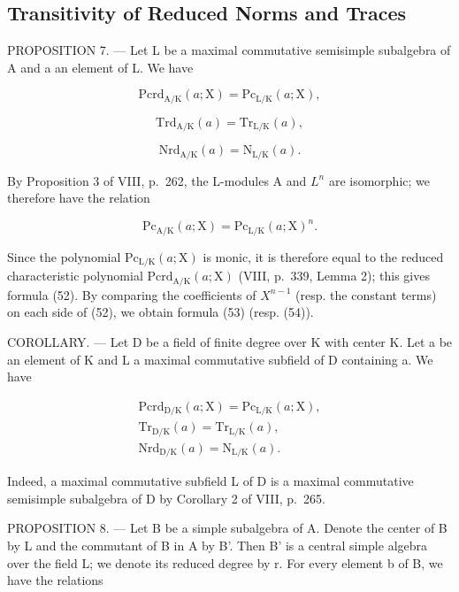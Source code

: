 \subsection{Transitivity of Reduced Norms and Traces}

PROPOSITION 7. --- Let L be a maximal commutative semisimple subalgebra of A and a an element of L. We have

\[
\mathrm{Pcrd} _ {\mathrm{A/K}} (a; \mathrm{X}) = \mathrm{Pc} _ {\mathrm{L/K}} (a; \mathrm{X}),\tag{52}
\]

\[
\mathrm{Trd} _ {\mathrm{A/K}} (a) = \mathrm{Tr} _ {\mathrm{L/K}} (a),\tag{53}
\]

\[
\mathrm{Nrd} _ {\mathrm{A/K}} (a) = \mathrm{N} _ {\mathrm{L/K}} (a).\tag{54}
\]

By Proposition 3 of VIII, p.~262, the L-modules A and \(L^{n}\) are isomorphic; we therefore have the relation

\[
\mathrm{Pc} _ {\mathrm{A/K}} (a; \mathrm{X}) = \mathrm{Pc} _ {\mathrm{L/K}} (a; \mathrm{X}) ^ {n}.
\]

Since the polynomial \(\mathrm{Pc}_{\mathrm{L}/\mathrm{K}}(a;\mathrm{X})\) is monic, it is therefore equal to the reduced characteristic polynomial \(\mathrm{Pcrd}_{\mathrm{A}/\mathrm{K}}(a;\mathrm{X})\) (VIII, p.~339, Lemma 2); this gives formula (52). By comparing the coefficients of \(X^{n-1}\) (resp. the constant terms) on each side of (52), we obtain formula (53) (resp. (54)).

COROLLARY. --- Let D be a field of finite degree over K with center K. Let a be an element of K and L a maximal commutative subfield of D containing a. We have

\[
\begin{array}{c} \mathrm {Pcrd_ {D / K}} (a; \mathrm{X}) = \mathrm {Pc_ {L / K}} (a; \mathrm{X}), \\ \mathrm{Tr} _ {\mathrm{D/K}} (a) = \mathrm{Tr} _ {\mathrm{L/K}} (a), \\ \mathrm{Nrd} _ {\mathrm{D/K}} (a) = \mathrm{N} _ {\mathrm{L/K}} (a). \end{array}\tag{55}
\]

Indeed, a maximal commutative subfield L of D is a maximal commutative semisimple subalgebra of D by Corollary 2 of VIII, p.~265.

PROPOSITION 8. --- Let B be a simple subalgebra of A. Denote the center of B by L and the commutant of B in A by B'. Then B' is a central simple algebra over the field L; we denote its reduced degree by r. For every element b of B, we have the relations

